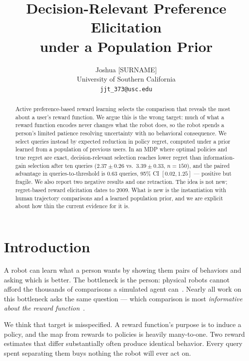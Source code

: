 \documentclass[10pt]{article}
\title{\vspace{-2.2em}Decision-Relevant Preference Elicitation\\
under a Population Prior}
\author{Joshua [SURNAME]\\
\small University of Southern California\\
\small \texttt{jjt\_373@usc.edu}}
\date{}
\begin{document}
\maketitle
\vspace{-2.2em}

\begin{abstract}
\noindent
Active preference-based reward learning selects the comparison that reveals the
most about a user's reward function. We argue this is the wrong target: much of
what a reward function encodes never changes what the robot does, so the robot
spends a person's limited patience resolving uncertainty with no behavioral
consequence. We select queries instead by expected reduction in policy regret,
computed under a prior learned from a population of previous users. In an MDP
where optimal policies and true regret are exact, decision-relevant selection
reaches lower regret than information-gain selection after ten queries
($2.37 \pm 0.26$ vs.\ $3.39 \pm 0.33$, $n{=}150$), %
and the paired advantage in
queries-to-threshold is $0.63$ queries, 95\% CI $[0.02, 1.25]$ %
--- positive but
fragile. We also report two negative results and one retraction. The idea is
not new; regret-based reward elicitation dates to 2009. What is new is the
instantiation with human trajectory comparisons and a learned population prior,
and we are explicit about how thin the current evidence for it is.
\end{abstract}

\section{Introduction}

A robot can learn what a person wants by showing them pairs of behaviors and
asking which is better. The bottleneck is the person: physical robots cannot
afford the thousands of comparisons a simulated agent can~\citep{sadigh2017}.
Nearly all work on this bottleneck asks the same question --- which comparison
is most \emph{informative about the reward function}~\citep{biyik2018,biyik2019,
biyik2024,hejna2022}.

We think that target is misspecified. A reward function's purpose is to induce a
policy, and the map from rewards to policies is heavily many-to-one. Two reward
estimates that differ substantially often produce identical behavior. Every
query spent separating them buys nothing the robot will ever act on.
\end{document}
